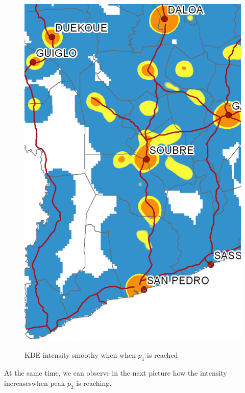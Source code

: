 \begin{figure}
{    \includegraphics[scale = 0.15]{results/images/kernel/l_hour8_kd_detail.pdf}
	\label{fig:subfig2_detail}
}
\caption[KDE intensity smoothy when $p_1$ is reached]{KDE intensity smoothy when when  $p_1$ is reached}
\label{fig:subfigureExample}
\end{figure}


At the same time, we can observe in the next picture how the intensity increaseswhen peak $p_2$ is reaching.

